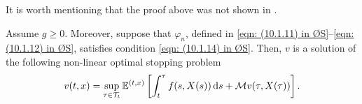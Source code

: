 \begin{remark}
    It is worth mentioning that the proof above was not shown in \cite{oksendal2007applied}.
\end{remark}

\begin{corollary}
\label{cor: Corollary 10.8 in ØS}
    Assume $g\geq 0$. Moreover, suppose that $\varphi_n$, defined in \eqref{eqn: (10.1.11) in ØS}--\eqref{eqn: (10.1.12) in ØS}, satisfies condition \eqref{eqn: (10.1.14) in ØS}. Then, $v$ is a solution of the following non-linear optimal stopping problem
    \begin{equation*}
        v(t,x) = \sup_{\tau \in \mathcal{T}_t} \mathbb{E}^{(t,x)} \left[ \int_t^\tau f(s,X(s)) \,\mathrm{d} s + \mathcal{M} v(\tau, X(\tau)) \right].
    \end{equation*}
\end{corollary}

